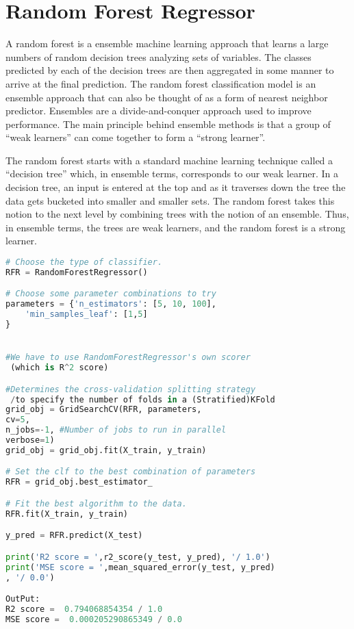 \section{Random Forest Regressor}
A random forest is a ensemble machine learning approach that learns a large numbers of random decision trees analyzing sets of variables. The classes predicted by each of the decision trees are then aggregated in some manner to arrive at the final prediction. The random forest classification model is an ensemble approach that can also be thought of as a form of nearest neighbor predictor. Ensembles are a divide-and-conquer approach used to improve performance. The main principle behind ensemble methods is that a group of “weak learners” can come together to form a “strong learner”. \cite{vceh:2018} \bigskip

The random forest starts with a standard machine learning technique called a “decision tree” which, in ensemble terms, corresponds to our weak learner. In a decision tree, an input is entered at the top and as it traverses down the tree the data gets bucketed into smaller and smaller sets. The random forest takes this notion to the next level by combining trees with the
notion of an ensemble. Thus, in ensemble terms, the trees are weak learners, and the random forest is a strong learner.

\begin{lstlisting}[language=Python]
# Choose the type of classifier. 
RFR = RandomForestRegressor()

# Choose some parameter combinations to try
parameters = {'n_estimators': [5, 10, 100],
	'min_samples_leaf': [1,5]
}


#We have to use RandomForestRegressor's own scorer 
 (which is R^2 score)

#Determines the cross-validation splitting strategy 
 /to specify the number of folds in a (Stratified)KFold
grid_obj = GridSearchCV(RFR, parameters,
cv=5, 
n_jobs=-1, #Number of jobs to run in parallel
verbose=1)
grid_obj = grid_obj.fit(X_train, y_train)

# Set the clf to the best combination of parameters
RFR = grid_obj.best_estimator_

# Fit the best algorithm to the data. 
RFR.fit(X_train, y_train)

y_pred = RFR.predict(X_test)

print('R2 score = ',r2_score(y_test, y_pred), '/ 1.0')
print('MSE score = ',mean_squared_error(y_test, y_pred)
, '/ 0.0')

OutPut:
R2 score =  0.794068854354 / 1.0
MSE score =  0.000205290865349 / 0.0	
\end{lstlisting}
%
%

